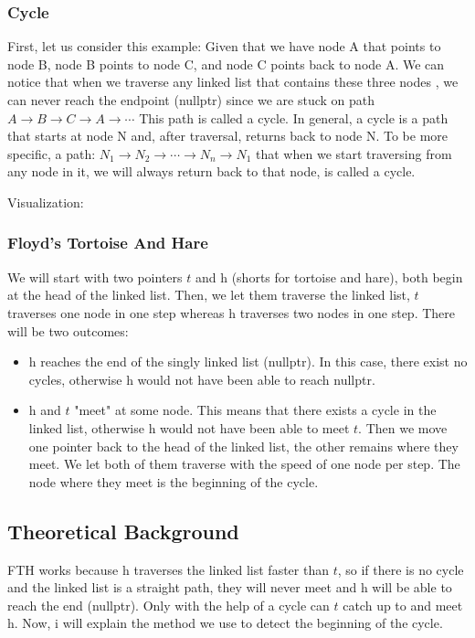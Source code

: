 \documentclass[12pt, letterpaper]{article}
\newcommand{\tortoise}{\textit{t}}
\newcommand{\hare}{\textit{h}}
\begin{document}
\subsubsection{Cycle}
First, let us consider this example: Given that we have node A that points to node B, node B points to node C, and node C points back to node A. We can notice that when we traverse any linked list that contains these three nodes , we can never reach the endpoint (nullptr) since we are stuck on path \( A \rightarrow B \rightarrow C \rightarrow A\rightarrow \cdots \) This path is called a cycle.
In general, a cycle is a path that starts at node N and, after traversal, returns back to node N. To be more specific, a path: \( N_1 \rightarrow N_2 \rightarrow \cdots \rightarrow N_n \rightarrow N_1 \) that when we start traversing from any node in it, we will always return back to that node, is called a cycle.

Visualization:
\subsubsection{Floyd's Tortoise And Hare}
We will start with two pointers \(\tortoise\) and \(\hare\) (shorts for tortoise and hare), both begin at the head of the linked list. Then, we let them traverse the linked list, \(\tortoise\) traverses one node in one step whereas \(\hare\) traverses two nodes in one step. There will be two outcomes:
\begin{itemize}
\item \(\hare\) reaches the end of the singly linked list (nullptr). In this case, there exist no cycles, otherwise \(\hare\) would not have been able to reach nullptr.
\item \(\hare\) and \(\tortoise\) "meet" at some node. This means that there exists a cycle in the linked list, otherwise \(\hare\) would not have been able to meet \(\tortoise\). Then we move one pointer back to the head of the linked list, the other remains where they meet. We let both of them traverse with the speed of one node per step. The node where they meet is the beginning of the cycle.
\end{itemize}
\subsection{Theoretical Background}
FTH works because \(\hare\) traverses the linked list faster than \(\tortoise\), so if there is no cycle and the linked list is a straight path, they will never meet and \(\hare\) will be able to reach the end (nullptr). Only with the help of a cycle can \(\tortoise\) catch up to and meet \(\hare\). Now, i will explain the method we use to detect the beginning of the cycle.
\end{document}
